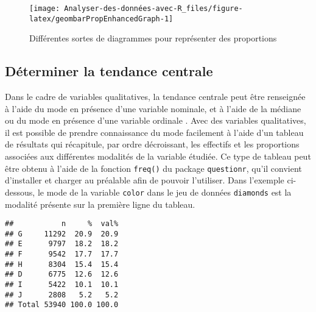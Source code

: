 \documentclass[
]{book}
\newenvironment{Shaded}{\begin{snugshade}}{\end{snugshade}}
\newcommand{\AttributeTok}[1]{\textcolor[rgb]{0.77,0.63,0.00}{#1}}
\newcommand{\ConstantTok}[1]{\textcolor[rgb]{0.00,0.00,0.00}{#1}}
\newcommand{\FunctionTok}[1]{\textcolor[rgb]{0.00,0.00,0.00}{#1}}
\newcommand{\NormalTok}[1]{#1}
\newcommand{\SpecialCharTok}[1]{\textcolor[rgb]{0.00,0.00,0.00}{#1}}
\newcommand{\StringTok}[1]{\textcolor[rgb]{0.31,0.60,0.02}{#1}}
\begin{document}
\begin{figure}

{\centering \texttt{[image: Analyser-des-données-avec-R\_files/figure-latex/geombarPropEnhancedGraph-1]} 

}

\caption{Différentes sortes de diagrammes pour représenter des proportions}\label{fig:geombarPropEnhancedGraph}
\end{figure}

\hypertarget{duxe9terminer-la-tendance-centrale}{%
\subsection{Déterminer la tendance centrale}\label{duxe9terminer-la-tendance-centrale}}

Dans le cadre de variables qualitatives, la tendance centrale peut être renseignée à l'aide du mode en présence d'une variable nominale, et à l'aide de la médiane ou du mode en présence d'une variable ordinale \autocite{gonzalesMeasuresCentralTendency2001}. Avec des variables qualitatives, il est possible de prendre connaissance du mode facilement à l'aide d'un tableau de résultats qui récapitule, par ordre décroissant, les effectifs et les proportions associées aux différentes modalités de la variable étudiée. Ce type de tableau peut être obtenu à l'aide de la fonction \texttt{freq()} du package \texttt{questionr}, qu'il convient d'installer et charger au préalable afin de pouvoir l'utiliser. Dans l'exemple ci-dessous, le mode de la variable \texttt{color} dans le jeu de données \texttt{diamonds} est la modalité présente sur la première ligne du tableau.

\begin{Shaded}
\end{Shaded}

\begin{verbatim}
##           n     %  val%
## G     11292  20.9  20.9
## E      9797  18.2  18.2
## F      9542  17.7  17.7
## H      8304  15.4  15.4
## D      6775  12.6  12.6
## I      5422  10.1  10.1
## J      2808   5.2   5.2
## Total 53940 100.0 100.0
\end{verbatim}
\end{document}
